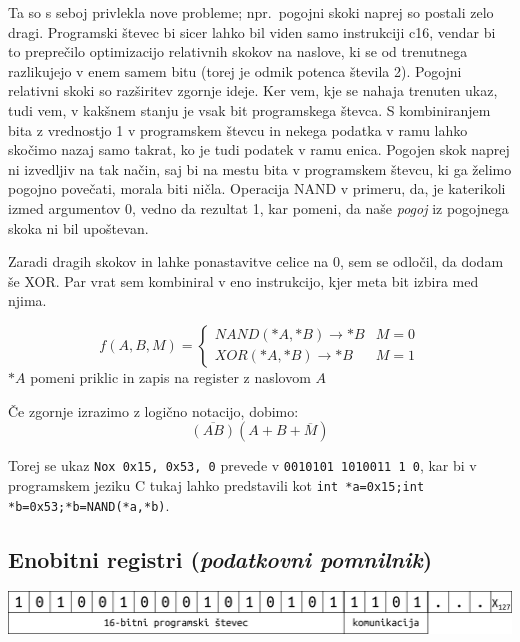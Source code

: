 \documentclass[12pt]{article}
\begin{document}
Ta so s seboj privlekla nove probleme; npr.\ pogojni skoki naprej so postali zelo dragi.
Programski števec bi sicer lahko bil viden samo instrukciji c16, vendar bi to preprečilo optimizacijo relativnih skokov na naslove, ki se od trenutnega razlikujejo v enem samem bitu (torej je odmik potenca števila 2).
Pogojni relativni skoki so razširitev zgornje ideje.
Ker vem, kje se nahaja trenuten ukaz, tudi vem, v kakšnem stanju je vsak bit programskega števca.
S kombiniranjem bita z vrednostjo 1 v programskem števcu in nekega podatka v ramu lahko skočimo nazaj samo takrat, ko je tudi podatek v ramu enica.
Pogojen skok naprej ni izvedljiv na tak način, saj bi na mestu bita v programskem števcu, ki ga želimo pogojno povečati, morala biti ničla.
Operacija NAND v primeru, da, je katerikoli izmed argumentov 0, vedno da rezultat 1, kar pomeni, da naše \textit{pogoj} iz pogojnega skoka ni bil upoštevan.

Zaradi dragih skokov in lahke ponastavitve celice na 0, sem se odločil, da dodam še XOR.\@
Par vrat sem kombiniral v eno instrukcijo, kjer meta bit izbira med njima.

\begin{displaymath}
  f(A,B,M) =
  \begin{cases}
    NAND(*A, *B) \rightarrow *B & M=0\\
    XOR(*A, *B) \rightarrow *B & M=1
  \end{cases}
\end{displaymath}
$*A$ pomeni priklic in zapis na register z naslovom $A$

Če zgornje izrazimo z logično notacijo, dobimo:
\begin{displaymath}
  \overline{(AB)}(A+B+\overline{M})
\end{displaymath}

Torej se ukaz \verb|Nox 0x15, 0x53, 0| prevede v \verb|0010101 1010011 1 0|, kar bi v programskem jeziku C tukaj lahko predstavili kot \verb|int *a=0x15;int *b=0x53;*b=NAND(*a,*b)|.

\pagebreak
\subsection{Enobitni registri (\textit{podatkovni pomnilnik})}

\begin{center}
  \includegraphics[width=\linewidth]{slike/predstavitev/reg.png}
\end{center}
\end{document}
